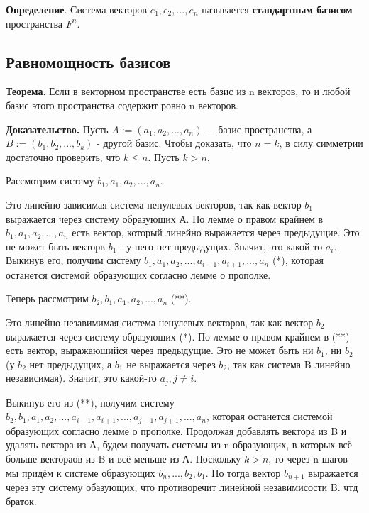 \documentclass[a4paper]{article}
\begin{document}
    \textbf{Определение}. Система векторов $e_1, e_2, ..., e_n$ называется \textbf{стандартным базисом} пространства $F^n$.

    \subsection*{Равномощность базисов}

    \begin{htheorem}
        \textbf{Теорема}. Если в векторном пространстве есть базис из n векторов, то и любой базис этого пространства содержит ровно n векторов.
    \end{htheorem}

    \begin{hproof}
        \textbf{Доказательство.} Пусть $A := (a_1, a_2, ..., a_n) - $ базис пространства, а $B := (b_1, b_2, ..., b_k)$ - другой базис. Чтобы доказать, что $n=k$, в силу симметрии достаточно проверить, что $k \leq n$. Пусть $k > n$.

        Рассмотрим систему $b_1, a_1, a_2, ..., a_n$.

        Это линейно зависимая система ненулевых векторов, так как вектор $b_1$ выражается через систему образующих А. По лемме о правом крайнем в $b_1, a_1, a_2, ..., a_n$ есть вектор, который линейно выражается через предыдущие. Это не может быть векторв $b_1$ - у него нет предыдущих. Значит, это какой-то $a_i$. Выкинув его, получим систему $b_1, a_1, a_2, ..., a_{i-1}, a_{i+1}, ..., a_n $ (*), которая останется системой образующих согласно лемме о прополке.

        Теперь рассмотрим $b_2, b_1, a_1, a_2, ..., a_n$ (**).

        Это линейно незавимимая система ненулевых векторов, так как вектор $b_2$ выражается через систему образующих (*). По лемме о правом крайнем в (**) есть вектор, выражаюшийся через предыдущие. Это не может быть ни $b_1$, ни $b_2$ (у $b_2$ нет предыдущих, а $b_1$ не выражается через $b_2$, так как система B линейно независимая). Значит, это какой-то $a_j, j \neq i$.

        Выкинув его из (**), получим систему $b_2, b_1, a_1, a_2, ..., a_{i-1}, a_{i+1}, ..., a_{j-1}, a_{j+1}, ...,a_n$, которая останется системой образующих согласно лемме о прополке. Продолжая добавлять вектора из B и удалять вектора из А, будем получать системы из n образующих, в которых всё больше вектораов из B и всё меньше из А. Поскольку $k>n$, то через n шагов мы придём к системе образующих $b_n, ..., b_2, b_1$. Но тогда вектор $b_{n+1}$ выражается через эту систему обазующих, что противоречит линейной незавимисости B. чтд браток.
    \end{hproof}
\end{document}
